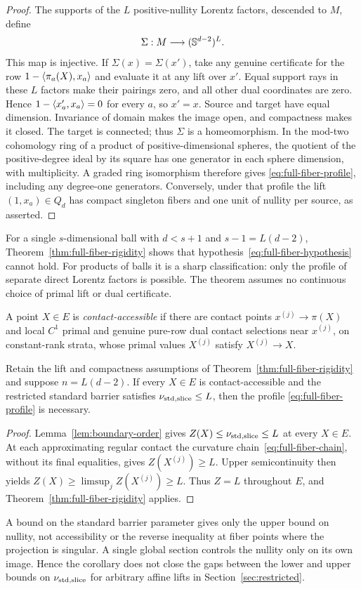 \begin{proof}
The supports of the $L$ positive-nullity Lorentz factors, descended to
$M$, define
\[
 \Sigma:M\longrightarrow(\mathbb S^{d-2})^L.
\]
This map is injective. If $\Sigma(x)=\Sigma(x')$, take any genuine
certificate for the row $1-\langle \pi_a(X),x_a\rangle$ and evaluate it at any
lift over $x'$. Equal support rays in these $L$ factors make their pairings zero,
and all other dual coordinates are zero. Hence
$1-\langle x'_a,x_a\rangle=0$ for every $a$, so $x'=x$.
Source and target have equal dimension. Invariance of domain makes the
image open, and compactness makes it closed. The target is connected;
thus $\Sigma$ is a homeomorphism. In the mod-two cohomology ring of a
product of positive-dimensional spheres, the quotient of the
positive-degree ideal by its square has one generator in each sphere
dimension, with multiplicity. A graded ring isomorphism therefore gives
\eqref{eq:full-fiber-profile}, including any degree-one generators.
Conversely, under that profile the lift
$(1,x_a)\in Q_d$ has compact singleton fibers and one unit of nullity
per source, as asserted.
\end{proof}

For a single $s$-dimensional ball with $d<s+1$ and $s-1=L(d-2)$,
Theorem~\ref{thm:full-fiber-rigidity} shows that
hypothesis~\eqref{eq:full-fiber-hypothesis} cannot hold. For products of
balls it is a sharp classification: only the profile of separate direct
Lorentz factors is possible. The theorem assumes no continuous choice of
primal lift or dual certificate.

\begin{definition}
A point $X\in E$ is \emph{contact-accessible} if there are contact points
$x^{(j)}\to\pi(X)$ and local $C^1$ primal and genuine pure-row dual
contact selections near $x^{(j)}$, on constant-rank strata, whose primal
values $X^{(j)}$ satisfy $X^{(j)}\to X$.
\end{definition}

\begin{corollary}\label{cor:accessible-fibers}
Retain the lift and compactness assumptions of
Theorem~\ref{thm:full-fiber-rigidity} and suppose $n=L(d-2)$.
If every $X\in E$ is contact-accessible and the restricted standard
barrier satisfies $\nu_{\mathrm{std},\mathrm{slice}}\leq L$, then the profile
\eqref{eq:full-fiber-profile} is necessary.
\end{corollary}
\begin{proof}
Lemma~\ref{lem:boundary-order} gives $Z(X)\leq\nu_{\mathrm{std},\mathrm{slice}}\leq L$ at
every $X\in E$. At each approximating regular contact the curvature
chain~\eqref{eq:full-fiber-chain}, without its final equalities, gives
$Z(X^{(j)})\geq L$. Upper semicontinuity then yields
$Z(X)\geq\limsup_j Z(X^{(j)})\geq L$. Thus $Z=L$ throughout $E$, and
Theorem~\ref{thm:full-fiber-rigidity} applies.
\end{proof}

A bound on the standard barrier parameter gives only the upper bound on
nullity, not accessibility or the reverse inequality at fiber points
where the projection is singular. A single global section controls the
nullity only on its own image. Hence the corollary does not close the
gaps between the lower and upper bounds on $\nu_{\mathrm{std},\mathrm{slice}}$ for arbitrary affine
lifts in Section~\ref{sec:restricted}.

